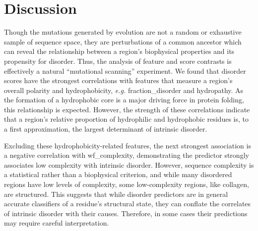 
\section{Discussion}
Though the mutations generated by evolution are not a random or exhaustive sample of sequence space, they are perturbations of a common ancestor which can reveal the relationship between a region's biophysical properties and its propensity for disorder. Thus, the analysis of feature and score contrasts is effectively a natural ``mutational scanning'' experiment. We found that disorder scores have the strongest correlations with features that measure a region's overall polarity and hydrophobicity, \textit{e.g.} fraction\_disorder and hydropathy. As the formation of a hydrophobic core is a major driving force in protein folding, this relationship is expected. However, the strength of these correlations indicate that a region's relative proportion of hydrophilic and hydrophobic residues is, to a first approximation, the largest determinant of intrinsic disorder.

Excluding these hydrophobicity-related features, the next strongest association is a negative correlation with wf\_complexity, demonstrating the predictor strongly associates low complexity with intrinsic disorder. However, sequence complexity is a statistical rather than a biophysical criterion, and while many disordered regions have low levels of complexity, some low-complexity regions, like collagen, are structured. This suggests that while disorder predictors are in general accurate classifiers of a residue's structural state, they can conflate the correlates of intrinsic disorder with their causes. Therefore, in some cases their predictions may require careful interpretation.

